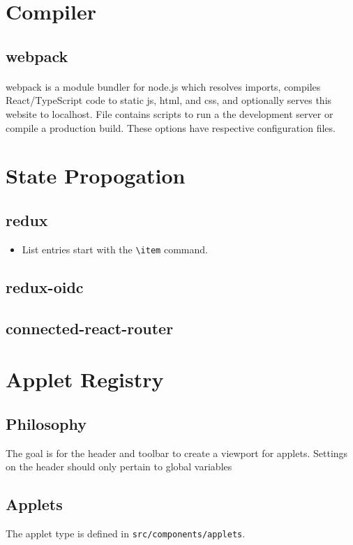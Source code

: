 \documentclass[12pt]{article}
\begin{document}
\tableofcontents
\newpage


\section{Compiler}
\subsection{webpack}
\paragraph{}webpack is a module bundler for node.js which resolves imports, compiles React/TypeScript code to static js, html, and css, and optionally serves this website to localhost. File  contains scripts to run a the development server or compile a production build. These options have respective configuration files.


\newpage


\section{State Propogation}
\subsection{redux}
\begin{itemize}
  \item List entries start with the \verb|\item| command.
\end{itemize}
\subsection{redux-oidc}
\subsection{connected-react-router}

\newpage

\section{Applet Registry}
\subsection{Philosophy} The goal is for the header and toolbar to create a viewport for applets. Settings on the header should only pertain to global variables
\subsection{Applets} The applet type is defined in \lstinline{src/components/applets}.

\newpage
\end{document}

